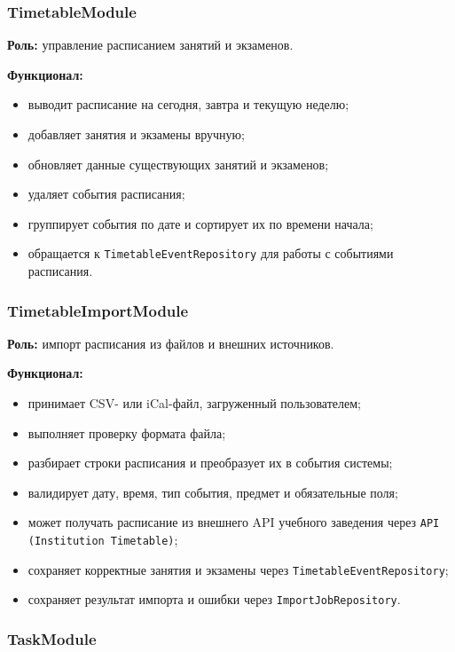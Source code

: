 \documentclass[10pt,a4paper,final]{article} %
\begin{document}
\subsubsection{TimetableModule}

\textbf{Роль:} управление расписанием занятий и экзаменов.

\textbf{Функционал:}
\begin{itemize}
    \item выводит расписание на сегодня, завтра и текущую неделю;
    \item добавляет занятия и экзамены вручную;
    \item обновляет данные существующих занятий и экзаменов;
    \item удаляет события расписания;
    \item группирует события по дате и сортирует их по времени начала;
    \item обращается к \texttt{TimetableEventRepository} для работы с событиями
    расписания.
\end{itemize}

\subsubsection{TimetableImportModule}

\textbf{Роль:} импорт расписания из файлов и внешних источников.

\textbf{Функционал:}
\begin{itemize}
    \item принимает CSV- или iCal-файл, загруженный пользователем;
    \item выполняет проверку формата файла;
    \item разбирает строки расписания и преобразует их в события системы;
    \item валидирует дату, время, тип события, предмет и обязательные поля;
    \item может получать расписание из внешнего API учебного заведения через
    \texttt{API (Institution Timetable)};
    \item сохраняет корректные занятия и экзамены через
    \texttt{TimetableEventRepository};
    \item сохраняет результат импорта и ошибки через \texttt{ImportJobRepository}.
\end{itemize}

\subsubsection{TaskModule}
\end{document}

